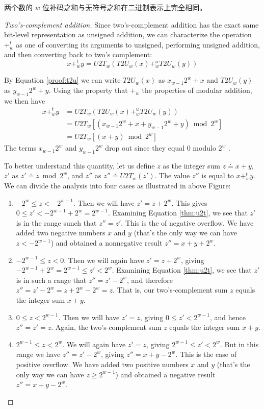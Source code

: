 两个数的 $w$ 位补码之和与无符号之和在二进制表示上完全相同。

\begin{proof}[Two's-complement addition]
    Since two’s-complement addition has the exact same bit-level representation as unsigned addition, we can characterize the operation $+^t_w$ as one of converting its arguments to unsigned, performing unsigned addition, and then converting back to two’s complement:
    \[
        x +^t_w y = U2T_w(T2U_w(x) +^u_w T2U_w(y))
    \]

    By Equation \eqref{proof:t2u} we can write $T2U_w(x)$ as $x_{w-1}2^w + x$ and $T2U_w(y)$ as $y_{w-1}2^w + y$. Using the property that $+_w$ the properties of modular addition, we then have
    \begin{align*}
        x +^t_w y & = U2T_w(T2U_w(x) +^u_w T2U_w(y)) \\
                  & = U2T_w[(x_{w-1}2^w + x + y_{w-1}2^w + y) \bmod 2^w] \\
                  & = U2T_w[(x + y) \bmod 2^w]
    \end{align*}
    The terms $x_{w−1}2^w$ and $y_{w−1}2^w$ drop out since they equal $0$ modulo $2^w$ .

    To better understand this quantity, let us define $z$ as the integer sum $z \doteq x + y$, $z'$ as $z' \doteq z \bmod 2^w$, and $z''$ as $z'' \doteq U2T_w(z')$. The value $z''$ is equal to $x +^t_w y$. We can divide the analysis into four cases as illustrated in above Figure:
    \begin{enumerate}
        \item $-2^w \leq z < -2^{w-1}$. Then we will have $z' = z + 2^w$. This gives $0 \leq z' < -2^{w-1} + 2^w = 2^{w-1}$. Examining Equation \eqref{thm:u2t}, we see that $z'$ is in the range sunch that $z'' = z'$. This is the of negative overflow. We have added two negative numbers $x$ and $y$ (that’s the only way we can have $z < −2^{w−1}$) and obtained a nonnegative result $z''  = x + y + 2^w$.
        \item $-2^{w-1} \leq z < 0$. Then we will again have $z' = z + 2^w$, giving $-2^{w-1} + 2^w = 2^{w-1} \leq z' < 2^w$. Examining Equation \eqref{thm:u2t}, we see that $z'$ is in such a range that $z'' = z' - 2^w$, and therefore $z'' = z' - 2^w = z + 2^w - 2^w = z$. That is, our two’s-complement sum $z$ equals the integer sum $x + y$.
        \item $0 \leq z < 2^{w-1}$. Then we will have $z' = z$, giving $0 \leq z' < 2^{w−1}$, and hence $z'' = z' = z$. Again, the two’s-complement sum $z$ equals the integer sum $x + y$.
        \item $2^{w-1} \leq z < 2^w$. We will again have $z' = z$, giving $2^{w−1} \leq z' < 2^w$. But in this range we have $z'' = z' − 2^w$, giving $z'' = x + y − 2^w$. This is the case of positive overflow. We have added two positive numbers $x$ and $y$ (that’s the only way we can have $z \geq 2^{w−1}$) and obtained a negative result $z'' = x + y − 2^w$.
    \end{enumerate}
\end{proof}

